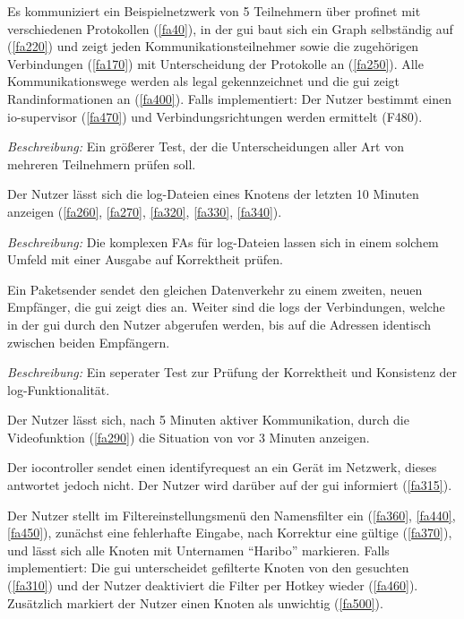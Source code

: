 \begin{description}[style=multiline, leftmargin=4cm, labelwidth=4cm]
   Es kommuniziert ein Beispielnetzwerk von 5 Teilnehmern über \gls{profinet} mit verschiedenen Protokollen (\ref{fa40}), in der \gls{gui} baut sich ein Graph selbständig auf (\ref{fa220}) und zeigt jeden Kommunikationsteilnehmer sowie die zugehörigen Verbindungen (\ref{fa170}) mit Unterscheidung der Protokolle an (\ref{fa250}). Alle Kommunikationswege werden als legal gekennzeichnet und die \gls{gui} zeigt Randinformationen an (\ref{fa400}). Falls implementiert: Der Nutzer bestimmt einen \gls{io-supervisor} (\ref{fa470}) und Verbindungsrichtungen werden ermittelt (F480). \par
      \textit{Beschreibung:} Ein größerer Test, der die Unterscheidungen aller Art von mehreren Teilnehmern prüfen soll.
  
   Der Nutzer lässt sich die \gls{log}-Dateien eines Knotens der letzten 10 Minuten anzeigen (\ref{fa260}, \ref{fa270}, \ref{fa320}, \ref{fa330}, \ref{fa340}). \par
      \textit{Beschreibung:} Die komplexen FAs für \gls{log}-Dateien lassen sich in einem solchem Umfeld mit einer Ausgabe auf Korrektheit prüfen.
  
   Ein Paketsender sendet den gleichen Datenverkehr zu einem zweiten, neuen Empfänger, die \gls{gui} zeigt dies an. Weiter sind die \glspl{log} der Verbindungen, welche in der \gls{gui} durch den Nutzer abgerufen werden, bis auf die Adressen identisch zwischen beiden Empfängern. \par
      \textit{Beschreibung:} Ein seperater Test zur Prüfung der Korrektheit und Konsistenz der \gls{log}-Funktionalität.
  
   Der Nutzer lässt sich, nach 5 Minuten aktiver Kommunikation, durch die Videofunktion (\ref{fa290}) die Situation von vor 3 Minuten anzeigen.
  
   Der \gls{iocontroller} sendet einen \gls{identifyrequest} an ein Gerät im Netzwerk, dieses antwortet jedoch nicht. Der Nutzer wird darüber auf der \gls{gui} informiert (\ref{fa315}).
  
   Der Nutzer stellt im Filtereinstellungsmenü den Namensfilter ein (\ref{fa360}, \ref{fa440}, \ref{fa450}), zunächst eine fehlerhafte Eingabe, nach Korrektur eine gültige (\ref{fa370}), und lässt sich alle Knoten mit Unternamen “Haribo” markieren. Falls implementiert: Die \gls{gui} unterscheidet gefilterte Knoten von den gesuchten (\ref{fa310}) und der Nutzer deaktiviert die Filter per Hotkey wieder (\ref{fa460}). Zusätzlich markiert der Nutzer einen Knoten als unwichtig (\ref{fa500}).
  

\end{description}
